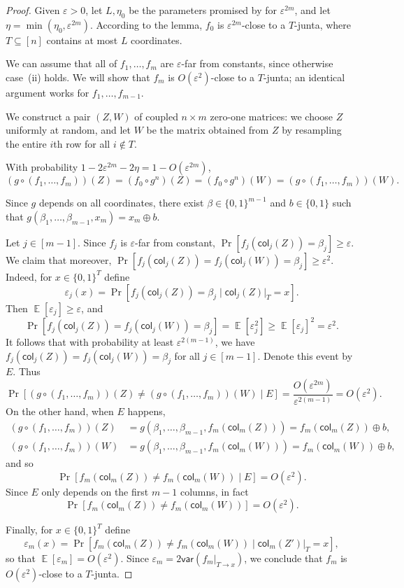 \documentclass{article}
\theoremstyle{definition}
\theoremstyle{remark}
\providecommand{\col}{\mathsf{col}}
\providecommand{\h}{g}
\DeclareMathOperator*{\E}{\mathbb{E}}
\providecommand{\V}[1]{\mathsf{var}(#1)}
\newcommand\eps{\varepsilon}
\renewcommand\epsilon{\eps}
\renewcommand\geq{\geqslant}
\begin{document}
\begin{proof}
Given $\epsilon > 0$, let $L,\eta_0$ be the parameters promised by  for $\epsilon^{2m}$, and let $\eta = \min(\eta_0,\epsilon^{2m})$. According to the lemma, $f_0$ is $\epsilon^{2m}$-close to a $T$-junta, where $T \subseteq [n]$ contains at most $L$ coordinates.

We can assume that all of $f_1,\ldots,f_m$ are $\epsilon$-far from constants, since otherwise case~(ii) holds. We will show that $f_m$ is $O(\epsilon^2)$-close to a $T$-junta; an identical argument works for $f_1,\ldots,f_{m-1}$.

We construct a pair $(Z,W)$ of coupled $n \times m$ zero-one matrices: we choose $Z$ uniformly at random, and let $W$ be the matrix obtained from $Z$ by resampling the entire $i$th row for all $i \notin T$.

With probability $1 - 2\epsilon^{2m} - 2\eta = 1 - O(\epsilon^{2m})$,
\[
 (\h \circ (f_1,\ldots,f_m))(Z) = (f_0 \circ g^n)(Z) = (f_0 \circ g^n)(W) = (\h \circ (f_1,\ldots,f_m))(W).
\]

Since $\h$ depends on all coordinates, there exist $\beta \in \{0,1\}^{m-1}$ and $b \in \{0,1\}$ such that $\h(\beta_1,\ldots,\beta_{m-1},x_m) = x_m \oplus b$. 

Let $j \in [m-1]$. Since $f_j$ is $\epsilon$-far from constant, $\Pr[f_j(\col_j(Z)) = \beta_j] \geq \epsilon$. We claim that moreover, $\Pr[f_j(\col_j(Z)) = f_j(\col_j(W)) = \beta_j] \geq \epsilon^2$. Indeed, for $x \in \{0,1\}^T$ define
\[
 \epsilon_j(x) = \Pr[f_j(\col_j(Z)) = \beta_j \mid \col_j(Z)|_T = x].
\]
Then $\E[\epsilon_j] \geq \epsilon$, and
\[
 \Pr[f_j(\col_j(Z)) = f_j(\col_j(W)) = \beta_j] = \E[\epsilon_j^2] \geq \E[\epsilon_j]^2 = \epsilon^2.
\]
It follows that with probability at least $\epsilon^{2(m-1)}$, we have $f_j(\col_j(Z)) = f_j(\col_j(W)) = \beta_j$ for all $j \in [m-1]$. Denote this event by $E$. Thus
\[
 \Pr[(\h \circ (f_1,\ldots,f_m))(Z) \neq (\h \circ (f_1,\ldots,f_m))(W) \mid E] = \frac{O(\epsilon^{2m})}{\epsilon^{2(m-1)}} = O(\epsilon^2).
\]
On the other hand, when $E$ happens,
\begin{align*}
 (\h \circ (f_1,\ldots,f_m))(Z) &= \h(\beta_1,\ldots,\beta_{m-1},f_m(\col_m(Z))) = f_m(\col_m(Z)) \oplus b, \\
 (\h \circ (f_1,\ldots,f_m))(W) &= \h(\beta_1,\ldots,\beta_{m-1},f_m(\col_m(W))) = f_m(\col_m(W)) \oplus b,
\end{align*}
and so
\[
 \Pr[f_m(\col_m(Z)) \neq f_m(\col_m(W)) \mid E] = O(\epsilon^2).
\]
Since $E$ only depends on the first $m-1$ columns, in fact
\[
 \Pr[f_m(\col_m(Z)) \neq f_m(\col_m(W))] = O(\epsilon^2).
\]

Finally, for $x \in \{0,1\}^T$ define
\[
 \epsilon_m(x) = \Pr[f_m(\col_m(Z)) \neq f_m(\col_m(W)) \mid \col_m(Z')|_T = x],
\]
so that $\E[\epsilon_m] = O(\epsilon^2)$. Since $\epsilon_m = 2\V{f_m|_{T \to x}}$, we conclude that $f_m$ is $O(\epsilon^2)$-close to a $T$-junta.
\end{proof}
\end{document}
